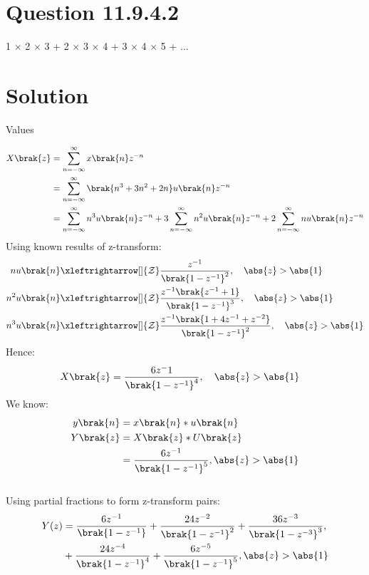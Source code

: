 \documentclass[journal,12pt,twocolumn]{IEEEtran}
\theoremstyle{remark}
\begin{document}
\section{Question 11.9.4.2}
1 $\times$ 2 $\times$  3 + 2 $\times$ 3 $\times$ 4 + 3 $\times$ 4 $\times$ 5 + ...
\section{Solution}
\begin{table}[!h]
    \centering
     \vspace{0.5cm}
    \caption{Values} 
    \label{tab:mytable}
\end{table}
\begin{align}
 X\brak{z} &= \sum_{n=-\infty}^\infty x \brak{n}  z^{-n}\\
  &= \sum_{n=-\infty}^\infty \brak{n^{3} + 3n^{2} + 2n} u\brak{n} z^{-n}\\
  &= \sum_{n=-\infty}^\infty n^{3} u \brak{n} z^{-n} + 3 \sum_{n=-\infty}^\infty n^{2} u \brak{n} z^{-n}+ 2\sum_{n=-\infty}^\infty n u \brak{n} z^{-n}
 \end{align}
 Using known results of z-transform:
 \begin{align}
 n u \brak{n} &\xleftrightarrow[]{\mathcal{Z}} \frac{z^{-1}}{\brak{1- z^{-1}}^2}, \quad \abs{z} > \abs{1}\\
 n^2 u \brak{n} &\xleftrightarrow[]{\mathcal{Z}} \frac{z^{-1} \brak{z^{-1} + 1}}{\brak{1- z^{-1}}^3}, \quad \abs{z} > \abs{1} \\
 n^3 u \brak{n} &\xleftrightarrow[]{\mathcal{Z}} \frac{z^{-1} \brak{1 + 4z^{-1} + z^{-2}} }{\brak{1- z^{-1}}^2}, \quad \abs{z} > \abs{1}
 \end{align}
 Hence:
 \begin{align}
 X\brak{z}&= \frac{6z^-1}{\brak{1-z^{-1}}^4} , \quad \abs{z} > \abs{1}
 \end{align}
We know:
\begin{align}
y\brak{n} &= x\brak{n}\ast u\brak{n}\\
    Y\brak{z} &= X\brak{z} \ast U\brak{z} \\
 &= \frac{6z^{-1}}{\brak{1-z^{-1}}^5} , \abs{z}> \abs{1} 
\end{align}
\\
Using partial fractions to form z-transform pairs:
\\
\begin{align}
Y(z) &= \frac{6z^{-1}}{\brak{1-z^{-1}}} + \frac{24z^{-2}}{\brak{1-z^{-1}}^2} + \frac{36z^{-3}}{\brak{1-z^{-3}}^3} , \\
    &+ \frac{24z^{-4}}{\brak{1-z^{-1}}^4}+\frac{6z^{-5}}{\brak{1-z^{-1}}^5} , \abs{z}>\abs{1} 
\end{align}
\end{document}
